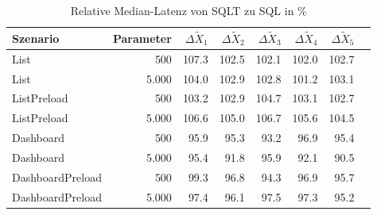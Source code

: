 
\begin{table}[ht]
\setlength{\extrarowheight}{-1pt}
\centering
\caption{Relative Median-Latenz von SQLT zu SQL in \%}
\begin{tabular}{lrrrrrrr}
\toprule
Szenario & Parameter & ${\Delta \tilde{X}_1}$ & ${\Delta \tilde{X}_2}$ & ${\Delta \tilde{X}_3}$ & ${\Delta \tilde{X}_4}$ & ${\Delta \tilde{X}_5}$ \\
\midrule
	List & 500 & \cellcolor{red!4}  107.3 & \cellcolor{red!1}  102.5 & \cellcolor{red!1}  102.1 & \cellcolor{red!1}  102.0 & \cellcolor{red!1}  102.7 \\
	List & 5.000 & \cellcolor{red!2}  104.0 & \cellcolor{red!1}  102.9 & \cellcolor{red!1}  102.8 & \cellcolor{red!1}  101.2 & \cellcolor{red!2}  103.1 \\
	ListPreload & 500 & \cellcolor{red!2}  103.2 & \cellcolor{red!1}  102.9 & \cellcolor{red!2}  104.7 & \cellcolor{red!2}  103.1 & \cellcolor{red!1}  102.7 \\
	ListPreload & 5.000 & \cellcolor{red!3}  106.6 & \cellcolor{red!2}  105.0 & \cellcolor{red!3}  106.7 & \cellcolor{red!3}  105.6 & \cellcolor{red!2}  104.5 \\
	Dashboard & 500 & \cellcolor{green!2}  95.9 & \cellcolor{green!2}  95.3 & \cellcolor{green!3}  93.2 & \cellcolor{green!2}  96.9 & \cellcolor{green!2}  95.4 \\
	Dashboard & 5.000 & \cellcolor{green!2}  95.4 & \cellcolor{green!4}  91.8 & \cellcolor{green!2}  95.9 & \cellcolor{green!4}  92.1 & \cellcolor{green!5}  90.5 \\
	DashboardPreload & 500 & \cellcolor{green!0}  99.3 & \cellcolor{green!2}  96.8 & \cellcolor{green!3}  94.3 & \cellcolor{green!2}  96.9 & \cellcolor{green!2}  95.7 \\
	DashboardPreload & 5.000 & \cellcolor{green!1}  97.4 & \cellcolor{green!2}  96.1 & \cellcolor{green!1}  97.5 & \cellcolor{green!1}  97.3 & \cellcolor{green!2}  95.2 \\
\bottomrule
\end{tabular}
\label{tab:relative_latenz_sqlt}
\end{table}
	